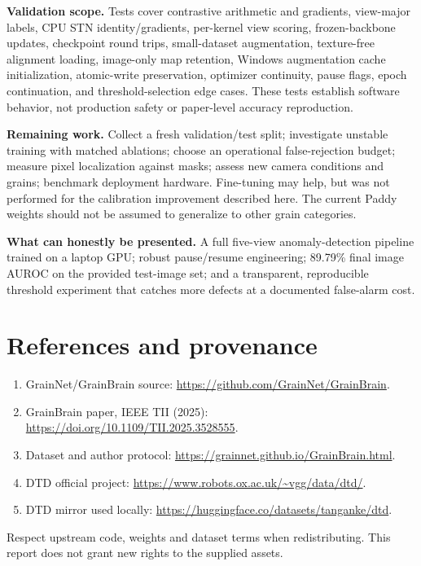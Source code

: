 \documentclass[11pt,a4paper]{article}
\begin{document}
\textbf{Validation scope.} Tests cover contrastive arithmetic and gradients, view-major labels, CPU STN identity/gradients, per-kernel view scoring, frozen-backbone updates, checkpoint round trips, small-dataset augmentation, texture-free alignment loading, image-only map retention, Windows augmentation cache initialization, atomic-write preservation, optimizer continuity, pause flags, epoch continuation, and threshold-selection edge cases. These tests establish software behavior, not production safety or paper-level accuracy reproduction.

\textbf{Remaining work.} Collect a fresh validation/test split; investigate unstable training with matched ablations; choose an operational false-rejection budget; measure pixel localization against masks; assess new camera conditions and grains; benchmark deployment hardware. Fine-tuning may help, but was not performed for the calibration improvement described here. The current Paddy weights should not be assumed to generalize to other grain categories.

\textbf{What can honestly be presented.} A full five-view anomaly-detection pipeline trained on a laptop GPU; robust pause/resume engineering; 89.79\% final image AUROC on the provided test-image set; and a transparent, reproducible threshold experiment that catches more defects at a documented false-alarm cost.

\section*{References and provenance}
\begin{enumerate}[leftmargin=*]
\item GrainNet/GrainBrain source: \url{https://github.com/GrainNet/GrainBrain}.
\item GrainBrain paper, IEEE TII (2025): \url{https://doi.org/10.1109/TII.2025.3528555}.
\item Dataset and author protocol: \url{https://grainnet.github.io/GrainBrain.html}.
\item DTD official project: \url{https://www.robots.ox.ac.uk/~vgg/data/dtd/}.
\item DTD mirror used locally: \url{https://huggingface.co/datasets/tanganke/dtd}.
\end{enumerate}
Respect upstream code, weights and dataset terms when redistributing. This report does not grant new rights to the supplied assets.
\end{document}
